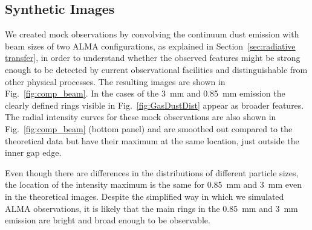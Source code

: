 \documentclass[fleqn,usenatbib]{mnras}
\begin{document}
    \subsection{Synthetic Images} \label{sec:synthetic-images}
        We created mock observations by convolving the continuum dust emission with beam sizes of two ALMA configurations, as explained in Section~\ref{sec:radiative transfer}, in order to understand whether the observed features might be strong enough to be detected by current observational facilities and distinguishable from other physical processes. 
        The resulting images are shown in Fig.~\ref{fig:comp_beam}.
        In the cases of the \SI{3}{mm} and \SI{0.85}{mm} emission the clearly defined rings visible in Fig.~\ref{fig:GasDustDist} appear as broader features.
        The radial intensity curves for these mock observations are also shown in Fig.~\ref{fig:comp_beam} (bottom panel) and are smoothed out compared to the theoretical data but have their maximum at the same location, just outside the inner gap edge.
        
        Even though there are differences in the distributions of different particle sizes, the location of the intensity maximum is the same for \SI{0.85}{mm} and \SI{3}{mm} even in the theoretical images. 
        Despite the simplified way in which we simulated ALMA observations, 
        it is likely that the main rings in the \SI{0.85}{mm} and \SI{3}{mm} emission are bright and broad enough to be observable.
        
\end{document}
